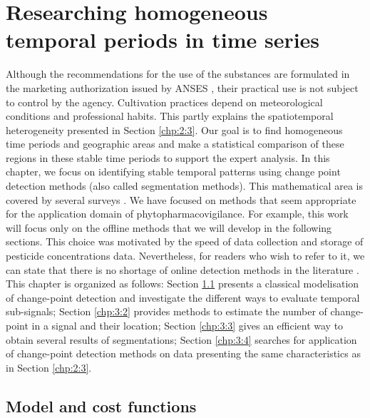 \chapter{Researching homogeneous temporal periods in time series}\label{chp:3}

\minitoc

\clearpage

Although the recommendations for the use of the substances are formulated in the marketing authorization issued by ANSES \cite{ephy}, their practical use is not subject to control by the agency. Cultivation practices depend on meteorological conditions and professional habits. This partly explains the spatiotemporal heterogeneity presented in Section \ref{chp:2:3}. Our goal is to find homogeneous time periods and geographic areas and make a statistical comparison of these regions in these stable time periods to support the expert analysis. In this chapter, we focus on identifying stable temporal patterns using change point detection methods (also called segmentation methods). This mathematical area is covered by several surveys \cite{truong2020,basseville1993detection,bardet2020}. We have focused on methods that seem appropriate for the application domain of phytopharmacovigilance. For example, this work will focus only on the offline methods that we will develop in the following sections. This choice was motivated by the speed of data collection and storage of pesticide concentrations data. Nevertheless, for readers who wish to refer to it, we can state that there is no shortage of online detection methods in the literature \cite{liu2017change,Li2021,hohle2010online,ranganathan2010pliss,li2015m}.
This chapter is organized as follows: Section \ref{chp:3:1} presents a classical modelisation of change-point detection and investigate the different ways to evaluate temporal sub-signals; Section \ref{chp:3:2} provides methods to estimate the number of change-point in a signal and their location; Section \ref{chp:3:3} gives an efficient way to obtain several results of segmentations; Section \ref{chp:3:4} searches for application of change-point detection methods on data presenting the same characteristics as in Section \ref{chp:2:3}.    

\section{Model and cost functions}\label{chp:3:1}

